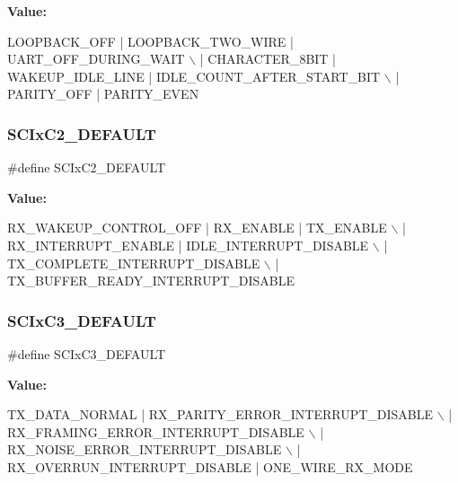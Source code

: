 {\bfseries Value\+:}
\begin{DoxyCode}
LOOPBACK\_OFF | LOOPBACK\_TWO\_WIRE | UART\_OFF\_DURING\_WAIT \(\backslash\)
            | CHARACTER\_8BIT | WAKEUP\_IDLE\_LINE | IDLE\_COUNT\_AFTER\_START\_BIT \(\backslash\)
            | PARITY\_OFF | PARITY\_EVEN
\end{DoxyCode}
\mbox{\label{group__hal__hcs08_gad91bb0f654e9398d1913fb23c872fd9a}} 
\subsubsection{\texorpdfstring{S\+C\+Ix\+C2\+\_\+\+D\+E\+F\+A\+U\+LT}{SCIxC2\_DEFAULT}}
{\footnotesize\ttfamily \#define S\+C\+Ix\+C2\+\_\+\+D\+E\+F\+A\+U\+LT}

{\bfseries Value\+:}
\begin{DoxyCode}
RX\_WAKEUP\_CONTROL\_OFF | RX\_ENABLE | TX\_ENABLE \(\backslash\)
            | RX\_INTERRUPT\_ENABLE | IDLE\_INTERRUPT\_DISABLE \(\backslash\)
            | TX\_COMPLETE\_INTERRUPT\_DISABLE \(\backslash\)
            | TX\_BUFFER\_READY\_INTERRUPT\_DISABLE
\end{DoxyCode}
\mbox{\label{group__hal__hcs08_ga4e57fc710ca7907c0d9ce9248b50ec67}} 
\subsubsection{\texorpdfstring{S\+C\+Ix\+C3\+\_\+\+D\+E\+F\+A\+U\+LT}{SCIxC3\_DEFAULT}}
{\footnotesize\ttfamily \#define S\+C\+Ix\+C3\+\_\+\+D\+E\+F\+A\+U\+LT}

{\bfseries Value\+:}
\begin{DoxyCode}
TX\_DATA\_NORMAL | RX\_PARITY\_ERROR\_INTERRUPT\_DISABLE \(\backslash\)
            | RX\_FRAMING\_ERROR\_INTERRUPT\_DISABLE \(\backslash\)
            | RX\_NOISE\_ERROR\_INTERRUPT\_DISABLE \(\backslash\)
            | RX\_OVERRUN\_INTERRUPT\_DISABLE | ONE\_WIRE\_RX\_MODE
\end{DoxyCode}
\mbox{\label{group__hal__hcs08_gaf03ceb7e519e6c12ed04a8f600ea217a}} 
